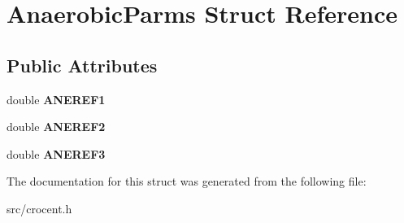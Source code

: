 \hypertarget{struct_anaerobic_parms}{\section{Anaerobic\-Parms Struct Reference}
\label{struct_anaerobic_parms}
}
\subsection*{Public Attributes}
\begin{DoxyCompactItemize}
\item 
\hypertarget{struct_anaerobic_parms_a810485a0b3a1b0db9cd5d2455bbc99c8}{double {\bfseries A\-N\-E\-R\-E\-F1}}\label{struct_anaerobic_parms_a810485a0b3a1b0db9cd5d2455bbc99c8}

\item 
\hypertarget{struct_anaerobic_parms_ab3d51254930593fc3e14e419725cb7bf}{double {\bfseries A\-N\-E\-R\-E\-F2}}\label{struct_anaerobic_parms_ab3d51254930593fc3e14e419725cb7bf}

\item 
\hypertarget{struct_anaerobic_parms_a6f5445dc4bcd176c92232e633a315707}{double {\bfseries A\-N\-E\-R\-E\-F3}}\label{struct_anaerobic_parms_a6f5445dc4bcd176c92232e633a315707}

\end{DoxyCompactItemize}


The documentation for this struct was generated from the following file\-:\begin{DoxyCompactItemize}
\item 
src/crocent.\-h\end{DoxyCompactItemize}
